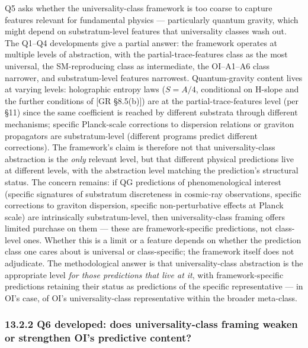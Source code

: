 \documentclass[
]{article}
\begin{document}
Q5 asks whether the universality-class framework is too coarse to
capture features relevant for fundamental physics --- particularly
quantum gravity, which might depend on substratum-level features that
universality classes wash out. The Q1--Q4 developments give a partial
answer: the framework operates at multiple levels of abstraction, with
the partial-trace-features class as the most universal, the
SM-reproducing class as intermediate, the OI--A1--A6 class narrower, and
substratum-level features narrowest. Quantum-gravity content lives at
varying levels: holographic entropy laws (\(S = A/4\), conditional on
H-slope and the further conditions of {[}GR §8.5(b){]}) are at the
partial-trace-features level (per §11) since the same coefficient is
reached by different substrata through different mechanisms; specific
Planck-scale corrections to dispersion relations or graviton propagators
are substratum-level (different programs predict different corrections).
The framework's claim is therefore not that universality-class
abstraction is the \emph{only} relevant level, but that different
physical predictions live at different levels, with the abstraction
level matching the prediction's structural status. The concern remains:
if QG predictions of phenomenological interest (specific signatures of
substratum discreteness in cosmic-ray observations, specific corrections
to graviton dispersion, specific non-perturbative effects at Planck
scale) are intrinsically substratum-level, then universality-class
framing offers limited purchase on them --- these are framework-specific
predictions, not class-level ones. Whether this is a limit or a feature
depends on whether the prediction class one cares about is universal or
class-specific; the framework itself does not adjudicate. The
methodological answer is that universality-class abstraction is the
appropriate level \emph{for those predictions that live at it}, with
framework-specific predictions retaining their status as predictions of
the specific representative --- in OI's case, of OI's universality-class
representative within the broader meta-class.

\hypertarget{q6-developed-does-universality-class-framing-weaken-or-strengthen-ois-predictive-content}{%
\subsubsection{13.2.2 Q6 developed: does universality-class framing
weaken or strengthen OI's predictive
content?}\label{q6-developed-does-universality-class-framing-weaken-or-strengthen-ois-predictive-content}}
\end{document}
